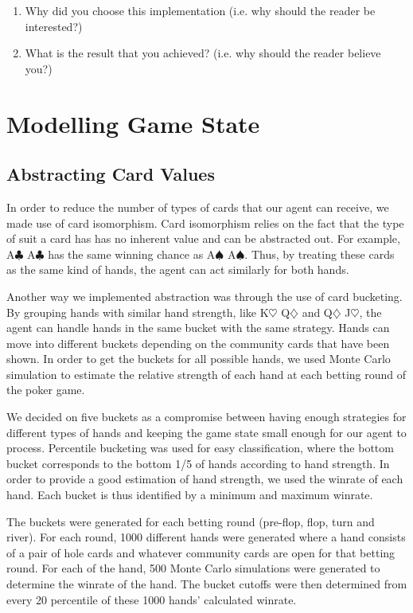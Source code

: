 \documentclass{article}
\begin{document}
\begin{enumerate}
	\item Why did you choose this implementation (i.e. why should the reader be interested?)
	\item What is the result that you achieved? (i.e. why should the reader believe you?)
\end{enumerate}

\section{Modelling Game State}

\subsection{Abstracting Card Values}

In order to reduce the number of types of cards that our agent can 
receive, we made use of card isomorphism. Card isomorphism relies 
on the fact that the type of suit a card has has no inherent value 
and can be abstracted out. For example, A$\clubsuit$ A$\clubsuit$ 
has the same winning chance as A$\spadesuit$ A$\spadesuit$. Thus, by 
treating these cards as the same kind of hands, the agent can act 
similarly for both hands.

Another way we implemented abstraction was through the use of card 
bucketing. By grouping hands with similar hand strength, like 
K$\heartsuit$ Q$\diamondsuit$ and Q$\diamondsuit$ J$\heartsuit$, the 
agent can handle hands in the same bucket with the same strategy. 
Hands can move into different buckets depending on the community 
cards that have been shown. In order to get the buckets for all 
possible hands, we used Monte Carlo simulation to estimate the 
relative strength of each hand at each betting round of the poker 
game.

We decided on five buckets as a compromise between having enough 
strategies for different types of hands and keeping the game state 
small enough for our agent to process. Percentile bucketing was 
used for easy classification, where the bottom bucket corresponds 
to the bottom 1/5 of hands according to hand strength. In order to 
provide a good estimation of hand strength, we used the winrate of 
each hand. Each bucket is thus identified by a minimum and maximum 
winrate.

The buckets were generated for each betting round (pre-flop, flop, 
turn and river). For each round, 1000 different hands were generated 
where a hand consists of a pair of hole cards and whatever community 
cards are open for that betting round. For each of the hand, 500 
Monte Carlo simulations were generated to determine the winrate of 
the hand. The bucket cutoffs were then determined from every 20 
percentile of these 1000 hands' calculated winrate.
\end{document}

